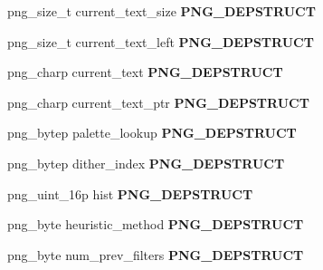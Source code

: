 \begin{DoxyCompactItemize}
\item 
\hypertarget{structpng__struct__def_a4fae46ecb38fa24f7de8202dc9e7db39}{png\-\_\-size\-\_\-t current\-\_\-text\-\_\-size {\bfseries P\-N\-G\-\_\-\-D\-E\-P\-S\-T\-R\-U\-C\-T}}\label{structpng__struct__def_a4fae46ecb38fa24f7de8202dc9e7db39}

\item 
\hypertarget{structpng__struct__def_afa122f78bdbc0e667d6ec985ee88773a}{png\-\_\-size\-\_\-t current\-\_\-text\-\_\-left {\bfseries P\-N\-G\-\_\-\-D\-E\-P\-S\-T\-R\-U\-C\-T}}\label{structpng__struct__def_afa122f78bdbc0e667d6ec985ee88773a}

\item 
\hypertarget{structpng__struct__def_aad598485fd88cf6566e5c50b41569264}{png\-\_\-charp current\-\_\-text {\bfseries P\-N\-G\-\_\-\-D\-E\-P\-S\-T\-R\-U\-C\-T}}\label{structpng__struct__def_aad598485fd88cf6566e5c50b41569264}

\item 
\hypertarget{structpng__struct__def_a34c10435db21021710c978fece933558}{png\-\_\-charp current\-\_\-text\-\_\-ptr {\bfseries P\-N\-G\-\_\-\-D\-E\-P\-S\-T\-R\-U\-C\-T}}\label{structpng__struct__def_a34c10435db21021710c978fece933558}

\item 
\hypertarget{structpng__struct__def_a390c42657e62830cefa511d36ffdc74a}{png\-\_\-bytep palette\-\_\-lookup {\bfseries P\-N\-G\-\_\-\-D\-E\-P\-S\-T\-R\-U\-C\-T}}\label{structpng__struct__def_a390c42657e62830cefa511d36ffdc74a}

\item 
\hypertarget{structpng__struct__def_ae42eb88eb481004ece9e51bf49c34872}{png\-\_\-bytep dither\-\_\-index {\bfseries P\-N\-G\-\_\-\-D\-E\-P\-S\-T\-R\-U\-C\-T}}\label{structpng__struct__def_ae42eb88eb481004ece9e51bf49c34872}

\item 
\hypertarget{structpng__struct__def_addaabec246c4e7b0f355006da530052d}{png\-\_\-uint\-\_\-16p hist {\bfseries P\-N\-G\-\_\-\-D\-E\-P\-S\-T\-R\-U\-C\-T}}\label{structpng__struct__def_addaabec246c4e7b0f355006da530052d}

\item 
\hypertarget{structpng__struct__def_a24f89c454fa60d40ab0d7cc1c58f26a3}{png\-\_\-byte heuristic\-\_\-method {\bfseries P\-N\-G\-\_\-\-D\-E\-P\-S\-T\-R\-U\-C\-T}}\label{structpng__struct__def_a24f89c454fa60d40ab0d7cc1c58f26a3}

\item 
\hypertarget{structpng__struct__def_a9a2f5af3f598c020498c5cbab10946d7}{png\-\_\-byte num\-\_\-prev\-\_\-filters {\bfseries P\-N\-G\-\_\-\-D\-E\-P\-S\-T\-R\-U\-C\-T}}\label{structpng__struct__def_a9a2f5af3f598c020498c5cbab10946d7}


\end{DoxyCompactItemize}
